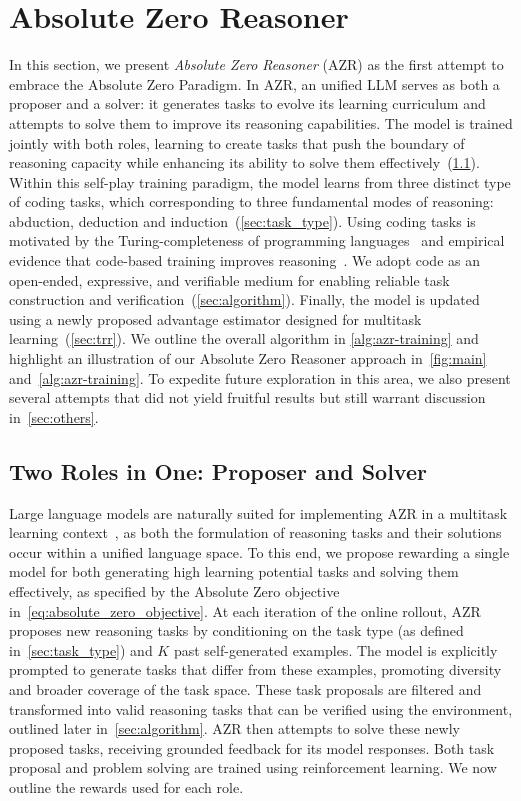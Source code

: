 \documentclass{article}
\begin{document}
\section{Absolute Zero Reasoner}
In this section, we present \emph{Absolute Zero Reasoner} (AZR) as the first attempt to embrace the Absolute Zero Paradigm. In AZR, an unified LLM serves as both a proposer and a solver: it generates tasks to evolve its learning curriculum and attempts to solve them to improve its reasoning capabilities. The model is trained jointly with both roles, learning to create tasks that push the boundary of reasoning capacity while enhancing its ability to solve them effectively~(\cref{sec:roles}). Within this self-play training paradigm, the model learns from three distinct type of coding tasks, which corresponding to  three fundamental modes of reasoning: abduction, deduction and induction~(\cref{sec:task_type}). Using coding tasks is motivated by the Turing-completeness of programming languages~\citep{stuart2013understanding} and empirical evidence that code-based training improves reasoning~\citep{aryabumi2024code}. We adopt code as an open-ended, expressive, and verifiable medium for enabling reliable task construction and verification~(\cref{sec:algorithm}). Finally, the model is updated using a newly proposed advantage estimator designed for multitask learning~(\cref{sec:trr}). We outline the overall algorithm in \cref{alg:azr-training} and highlight an illustration of our Absolute Zero Reasoner approach in~\cref{fig:main} and~\cref{alg:azr-training}. To expedite future exploration in this area, we also present several attempts that did not yield fruitful results but still warrant discussion in~\cref{sec:others}.


\subsection{Two Roles in One: Proposer and Solver}
\label{sec:roles}
Large language models are naturally suited for implementing AZR in a multitask learning context~\citep{radford2019language}, as both the formulation of reasoning tasks and their solutions occur within a unified language space. To this end, we propose rewarding a single model for both generating high learning potential tasks and solving them effectively, as specified by the Absolute Zero objective in~\cref{eq:absolute_zero_objective}. At each iteration of the online rollout, AZR proposes new reasoning tasks by conditioning on the task type (as defined in~\cref{sec:task_type}) and $K$ past self-generated examples. The model is explicitly prompted to generate tasks that differ from these examples, promoting diversity and broader coverage of the task space. These task proposals are filtered and transformed into valid reasoning tasks that can be verified using the environment, outlined later in~\cref{sec:algorithm}. AZR then attempts to solve these newly proposed tasks, receiving grounded feedback for its model responses. Both task proposal and problem solving are trained using reinforcement learning. We now outline the rewards used for each role.
\end{document}
